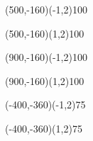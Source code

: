 \documentclass[12pt]{article}
\begin{document}
\begin{figure}[htb]
\begin{egame}
\putbranch(500,-160)(-1,2){100}

\renewcommand{\egarrowstyle}{}

\putbranch(500,-160)(1,2){100}

\renewcommand{\egarrowstyle}{e}

\putbranch(900,-160)(-1,2){100}

\renewcommand{\egarrowstyle}{e}

\putbranch(900,-160)(1,2){100}




\renewcommand{\egarrowstyle}{}

\putbranch(-400,-360)(-1,2){75}

\renewcommand{\egarrowstyle}{}

\putbranch(-400,-360)(1,2){75}




\end{egame}
\end{figure}
\end{document}
